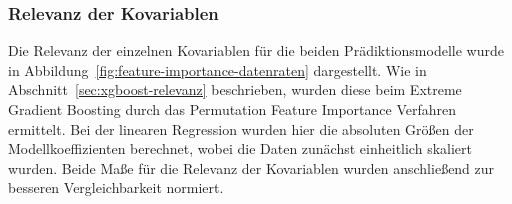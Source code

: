 \subsubsection{Relevanz der Kovariablen}

Die Relevanz der einzelnen Kovariablen f\"ur die beiden Pr\"adiktionsmodelle wurde in Abbildung~\ref{fig:feature-importance-datenraten}
dargestellt.
Wie in Abschnitt~\ref{sec:xgboost-relevanz} beschrieben, wurden diese beim Extreme Gradient Boosting durch das
Permutation Feature Importance Verfahren ermittelt.
Bei der linearen Regression wurden hier die absoluten Gr\"o{\ss}en der Modellkoeffizienten berechnet, wobei die Daten zun\"achst
einheitlich skaliert wurden.
Beide Ma{\ss}e f\"ur die Relevanz der Kovariablen wurden anschlie{\ss}end zur besseren Vergleichbarkeit normiert.

